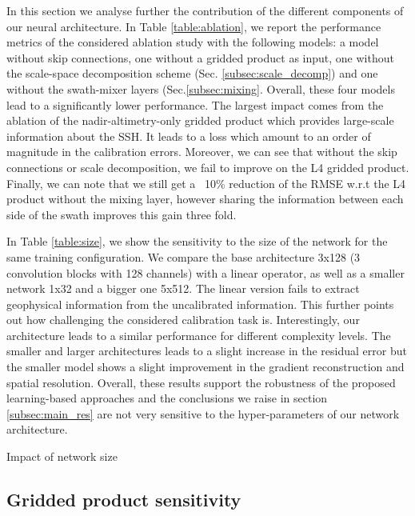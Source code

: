 \begin{bibunit}
In this section we analyse further the contribution of the different components of our neural architecture. 
In Table \ref{table:ablation}, we report 
the performance metrics of the considered ablation study with the following models:
a model without skip connections, one without a gridded product as input, one without the scale-space decomposition scheme (Sec. \ref{subsec:scale_decomp}) and one without the swath-mixer layers (Sec.\ref{subsec:mixing}. Overall, these four models lead to a significantly lower performance. 
The largest impact comes from the ablation of the nadir-altimetry-only gridded product which provides large-scale information about the SSH. It leads to a loss which amount to an order of magnitude in the calibration errors.
Moreover, we can see that without the skip connections or scale decomposition, we fail to improve on the L4 gridded product.
Finally, we can note that we still get a ~10\% reduction of the RMSE w.r.t the L4 product without the mixing layer, however sharing the information between each side of the swath improves this gain three fold.

% 

In Table \ref{table:size}, we show the sensitivity to the size of the network for the same training configuration. We compare the base architecture 3x128 (3 convolution blocks with 128 channels) with a linear operator, as well as a smaller network 1x32 and a bigger one 5x512. The linear version fails to extract geophysical information from the uncalibrated information. This further points out how challenging the considered calibration task is. Interestingly, our architecture leads to a similar performance for different complexity levels. The smaller and larger architectures leads to a slight increase in the residual error but the smaller model shows a slight improvement in the gradient reconstruction and spatial resolution.
Overall, these results support the robustness of the proposed learning-based approaches and the conclusions we raise in section \ref{subsec:main_res} are not very sensitive to the hyper-parameters of our network architecture.
\begin{table}[t]
\begin{center}

\end{center}
\caption{Impact of network size}
\label{table:size}
\end{table}

\subsection{Gridded product sensitivity} 
\label{subsec:gridded_sens}
\noindent


\end{bibunit}
